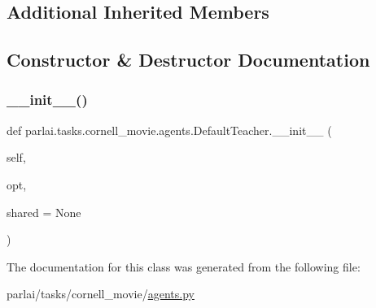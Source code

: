 \subsection*{Additional Inherited Members}


\subsection{Constructor \& Destructor Documentation}
\mbox{\label{classparlai_1_1tasks_1_1cornell__movie_1_1agents_1_1DefaultTeacher_a0e6994f898313bb5117f56fc4ca78bb7}} 
\subsubsection{\texorpdfstring{\+\_\+\+\_\+init\+\_\+\+\_\+()}{\_\_init\_\_()}}
{\footnotesize\ttfamily def parlai.\+tasks.\+cornell\+\_\+movie.\+agents.\+Default\+Teacher.\+\_\+\+\_\+init\+\_\+\+\_\+ (\begin{DoxyParamCaption}\item[{}]{self,  }\item[{}]{opt,  }\item[{}]{shared = {\ttfamily None} }\end{DoxyParamCaption})}



The documentation for this class was generated from the following file\+:\begin{DoxyCompactItemize}
\item 
parlai/tasks/cornell\+\_\+movie/\hyperlink{parlai_2tasks_2cornell__movie_2agents_8py}{agents.\+py}\end{DoxyCompactItemize}

